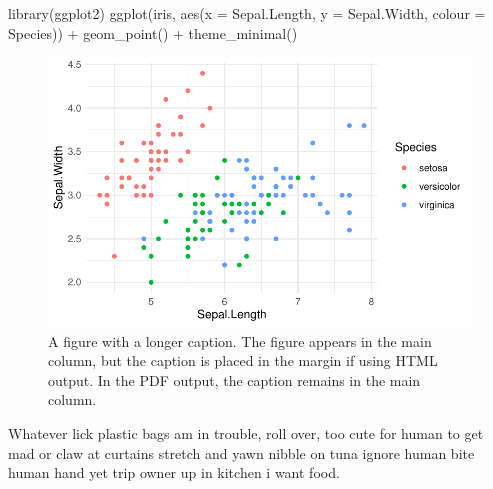 \documentclass[
  10pt,
  letterpaper,
  DIV=11,
  numbers=noendperiod]{scrartcl}
\newenvironment{Shaded}{\begin{snugshade}}{\end{snugshade}}
\newcommand{\AttributeTok}[1]{\textcolor[rgb]{0.40,0.45,0.13}{#1}}
\newcommand{\FunctionTok}[1]{\textcolor[rgb]{0.28,0.35,0.67}{#1}}
\newcommand{\NormalTok}[1]{\textcolor[rgb]{0.00,0.23,0.31}{#1}}
\newcommand{\SpecialCharTok}[1]{\textcolor[rgb]{0.37,0.37,0.37}{#1}}
\begin{document}
\begin{Shaded}
\begin{Highlighting}[]
\FunctionTok{library}\NormalTok{(ggplot2)}
\FunctionTok{ggplot}\NormalTok{(iris, }\FunctionTok{aes}\NormalTok{(}\AttributeTok{x =}\NormalTok{ Sepal.Length,}
                 \AttributeTok{y =}\NormalTok{ Sepal.Width,}
                 \AttributeTok{colour =}\NormalTok{ Species)) }\SpecialCharTok{+}
  \FunctionTok{geom\_point}\NormalTok{() }\SpecialCharTok{+}
  \FunctionTok{theme\_minimal}\NormalTok{()}
\end{Highlighting}
\end{Shaded}

\begin{figure}[H]

{\centering \includegraphics{template_files/figure-pdf/fig-main-margin-cap-1.pdf}

}

\caption{\label{fig-main-margin-cap}A figure with a longer caption. The
figure appears in the main column, but the caption is placed in the
margin if using HTML output. In the PDF output, the caption remains in
the main column.}

\end{figure}

\begin{tcolorbox}[enhanced jigsaw, leftrule=.75mm, colframe=quarto-callout-tip-color-frame, bottomtitle=1mm, colback=white, opacityback=0, breakable, rightrule=.15mm, left=2mm, bottomrule=.15mm, toprule=.15mm, titlerule=0mm, colbacktitle=quarto-callout-tip-color!10!white, title=\textcolor{quarto-callout-tip-color}{\faLightbulb}\hspace{0.5em}{Step 1: Sit on human}, coltitle=black, opacitybacktitle=0.6, toptitle=1mm, arc=.35mm]

Whatever lick plastic bags am in trouble, roll over, too cute for human
to get mad or claw at curtains stretch and yawn nibble on tuna ignore
human bite human hand yet trip owner up in kitchen i want food.

\end{tcolorbox}
\end{document}
